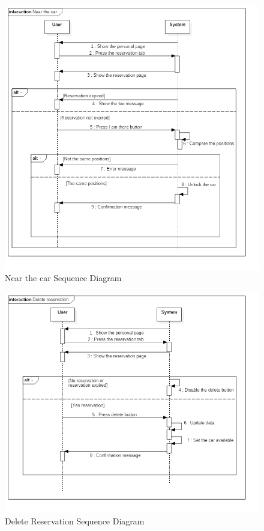 \vspace{10pt}
\begin{figure}[htbp]
\centering
\includegraphics[width=\textwidth]{Images/UML/Near}
\caption{Near the car Sequence Diagram}
\label{fig:nearseq}
\end{figure}
\clearpage

\vspace{10pt}
\begin{figure}[htbp]
\centering
\includegraphics[width=\textwidth]{Images/UML/Delete}
\caption{Delete Reservation Sequence Diagram}
\label{fig:delseq}
\end{figure}
\clearpage

